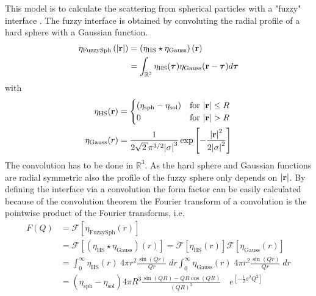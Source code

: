 This model is to calculate the scattering from spherical particles
with a "fuzzy" interface \cite{Stieger2004}. The fuzzy interface
is obtained by convoluting the radial profile of a hard sphere
with a Gaussian function.
\begin{align}
\eta_\text{FuzzySph}\left(\abs{\mathbf{r}}\right)
        &= \left(\eta_\text{HS}\star\eta_\text{Gauss}\right)(\mathbf{r}) \nonumber \\
        &= \int_{\mathbb{R}^3}\eta_\text{HS}(\boldsymbol{\tau}) \eta_\text{Gauss}(\mathbf{r}-\boldsymbol{\tau}) d\boldsymbol{\tau}
\end{align}
with
\begin{subequations}
\begin{align}
\eta_\text{HS}(\mathbf{r}) &=
\begin{cases}
\left(\eta_\text{sph}-\eta_\text{sol}\right) & \mbox{for~} \abs{\mathbf{r}}\leq R \\
0 & \mbox{for~} \abs{\mathbf{r}}>R
\end{cases} \\
\eta_\text{Gauss}(r) &= \frac{1}{2 \sqrt{2} \pi^{3/2}
\abs{\sigma}^3} \exp\left[ -\frac{\abs{\mathbf{r}}^2}{2
\abs{\sigma}^2}\right]
\end{align}
\end{subequations}
The convolution has to be done in $\mathbb{R}^3$. As the hard
sphere and Gaussian functions are radial symmetric also the
profile of the fuzzy sphere only depends on $\abs{\mathbf{r}}$. By
defining the interface via a convolution the form factor can be
easily calculated because of the convolution theorem the Fourier
transform of a convolution is the pointwise product of the Fourier
transforms, i.e.
\begin{equation}
\begin{split}
F(Q) &= \mathcal{F}\left[\eta_\text{FuzzySph}(r) \right] \\
&=
  \mathcal{F}\left[\left(\eta_\text{HS}\star\eta_\text{Gauss}\right)(r)\right]
= \mathcal{F}\left[\eta_\text{HS}(r)\right] \mathcal{F}\left[\eta_\text{Gauss}(r)\right] \\
&=
   \int_0^{\infty} \eta_\text{HS}(r)\; 4\pi r^2\frac{\sin\left(Qr\right)}{Qr} \; dr \int_0^{\infty} \eta_\text{Gauss}(r)\; 4\pi r^2\frac{\sin\left(Qr\right)}{Qr} \; dr \\
&= \left(\eta_\text{sph}-\eta_\text{sol}\right) 4\pi R^3%
   \frac{\sin\left(QR\right)-QR\cos\left(QR\right)}{\left(QR\right)^3} \quad e^{\left[-\frac{1}{2}\sigma^2Q^2\right]}
\end{split}
\end{equation}


